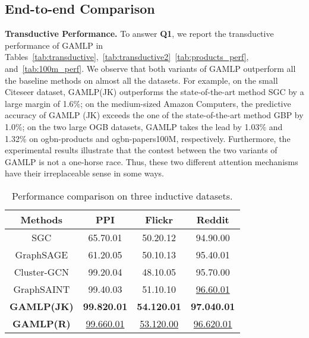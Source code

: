 \documentclass[sigconf]{acmart}
\begin{document}
\subsection{End-to-end Comparison}  

\textbf{Transductive Performance.}  To answer \textbf{Q1}, we report the transductive performance of GAMLP in Tables~\ref{tab:transductive},~\ref{tab:transductive2}~\ref{tab:products_perf}, and~\ref{tab:100m_perf}. 
We observe that both variants of GAMLP outperform all the baseline methods on almost all the datasets.
For example, on the small Citeseer dataset, GAMLP(JK) outperforms the state-of-the-art method SGC by a large margin of 1.6\%; on the medium-sized Amazon Computers, the predictive accuracy of GAMLP (JK) exceeds the one of the state-of-the-art method GBP by 1.0\%; on the two large OGB datasets, GAMLP takes the lead by 1.03\% and 1.32\% on ogbn-products and ogbn-papers100M, respectively.
Furthermore, the experimental results illustrate that the contest between the two variants of GAMLP is not a one-horse race.
Thus, these two different attention mechanisms have their irreplaceable sense in some ways.

\begin{table}
    \begin{center}
\caption{Performance comparison on three inductive datasets.}
    \label{tab:inductive}
    \vspace{-2mm}
    \begin{tabular}{c|ccc}
    \toprule
    \textbf{Methods} & \textbf{PPI} & \textbf{Flickr} & \textbf{Reddit} \\
    \midrule
    SGC & 65.70.01 & 50.20.12 & 94.90.00 \\
    GraphSAGE &  61.20.05  &  50.10.13  &  95.40.01   \\
    Cluster-GCN &  99.20.04  &  48.10.05  &  95.70.00  \\
    GraphSAINT& 99.40.03 & 51.10.10 & \underline{96.60.01} \\
    \midrule
    \textbf{GAMLP(JK)}   & \textbf{99.820.01} & \textbf{54.120.01} & \textbf{97.040.01} \\    
    \textbf{GAMLP(R)}   & \underline{99.660.01} & \underline{53.120.00} & \underline{96.620.01} \\       
    \bottomrule
    \end{tabular}
    \end{center}
    \vspace{-3mm}
\end{table}
\end{document}
